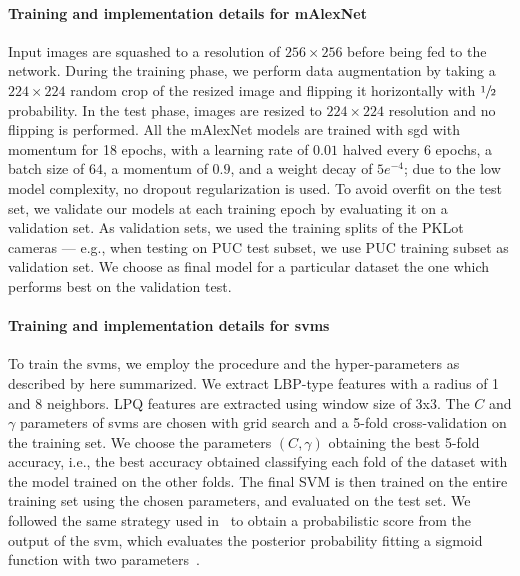 \paragraph{Training and implementation details for mAlexNet}
Input images are squashed to a resolution of $256\times256$ before being fed to the network.
During the training phase, we perform data augmentation by taking a $224\times224$ random crop of the resized image and flipping it horizontally with $\sfrac{1}{2}$ probability.
In the test phase, images are resized to $224\times224$ resolution and no flipping is performed.
All the mAlexNet models are trained with \gls{sgd} with momentum for 18 epochs, with a learning rate of $0.01$ halved every 6 epochs, a batch size of $64$, a momentum of $0.9$, and a weight decay of $5e^{-4}$;
due to the low model complexity, no dropout regularization is used.
To avoid overfit on the test set, we validate our models at each training epoch by evaluating it on a validation set.
As validation sets, we used the training splits of the PKLot cameras --- e.g., when testing on PUC test subset, we use PUC training subset as validation set.
We choose as final model for a particular dataset the one which performs best on the validation test.

\paragraph{Training and implementation details for \glspl{svm}}
To train the \glspl{svm}, we employ the procedure and the hyper-parameters as described by \citet{de2015pklot} here summarized.
We extract LBP-type features with a radius of 1 and 8 neighbors.
LPQ features are extracted using window size of 3x3.
The $C$ and $\gamma$ parameters of \glspl{svm} are chosen with grid search and a 5-fold cross-validation on the training set.
We choose the parameters $(C,\gamma)$ obtaining the best 5-fold accuracy, i.e., the best accuracy obtained classifying each fold of the dataset with the model trained on the other folds.
The final SVM is then trained on the entire training set using the chosen parameters, and evaluated on the test set.
We followed the same strategy used in~\cite{de2015pklot} to obtain a probabilistic score from the output of the \gls{svm}, which evaluates the posterior probability fitting a sigmoid function with two parameters~\cite{platt1999probabilistic}.

